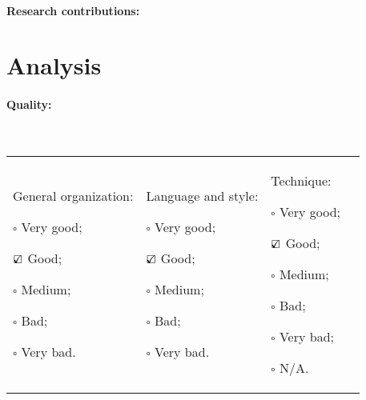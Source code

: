 \documentclass[11pt]{article}
\begin{document}
\paragraph{Research contributions:}

\section{Analysis}

\paragraph{Quality:} ~\newline
\begin{tabular}{p{}p{}p{}p{}}
\begin{minipage}[t]{.25\textwidth}
General organization:
\begin{description}
\item $\square$ Very good;
\item $\mbox{\ooalign{$\checkmark$\cr\hidewidth$\square$\hidewidth\cr}}$ Good;
\item $\square$ Medium;
\item $\square$ Bad;
\item $\square$ Very bad.
\end{description}
\end{minipage}

&

\begin{minipage}[t]{.25\textwidth}
Language and style:
\begin{description}
\item $\square$ Very good;
\item $\mbox{\ooalign{$\checkmark$\cr\hidewidth$\square$\hidewidth\cr}}$ Good;
\item $\square$ Medium;
\item $\square$ Bad;
\item $\square$ Very bad.
\end{description}
\end{minipage}

&

\begin{minipage}[t]{.25\textwidth}
Technique:
\begin{description}
\item $\square$ Very good;
\item $\mbox{\ooalign{$\checkmark$\cr\hidewidth$\square$\hidewidth\cr}}$ Good;
\item $\square$ Medium;
\item $\square$ Bad;
\item $\square$ Very bad;
\item $\square$ N/A.
\end{description}
\end{minipage}


\end{tabular}
\end{document}
